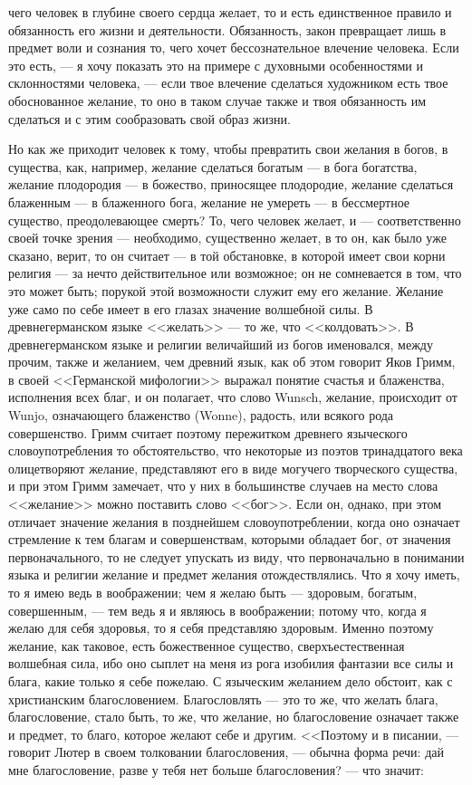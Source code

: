 \documentclass[12pt]{article}
\begin{document}
чего человек в глубине своего сердца желает, то и есть единственное правило и обязанность его жизни и деятельности. Обязанность, закон превращает лишь в предмет воли и сознания то, чего хочет бессознательное влечение человека. Если это есть, --- я хочу показать это на примере с духовными особенностями и склонностями человека, --- если твое влечение сделаться художником есть твое обоснованное желание, то оно в таком случае также и твоя обязанность им сделаться и с этим сообразовать свой образ жизни. 

Но как же приходит человек к тому, чтобы превратить свои желания в богов, в существа, как, например, желание сделаться богатым --- в бога богатства, желание плодородия --- в божество, приносящее плодородие, желание сделаться блаженным --- в блаженного бога, желание не умереть --- в бессмертное существо, преодолевающее смерть? То, чего человек желает, и --- соответственно своей точке зрения --- необходимо, существенно желает, в то он, как было уже сказано, верит, то он считает --- в той обстановке, в которой имеет свои корни религия --- за нечто действительное или возможное; он не сомневается в том, что это может быть; порукой этой возможности служит ему его желание. Желание уже само по себе имеет в его глазах значение волшебной силы. В древнегерманском языке <<желать>> --- то же, что <<колдовать>>. В древнегерманском языке и религии величайший из богов именовался, между прочим, также и желанием, чем древний язык, как об этом говорит Яков Гримм, в своей <<Германской мифологии>>  выражал понятие счастья и блаженства, исполнения всех благ, и он полагает, что слово Wunsch, желание, происходит от Wunjo, означающего блаженство (Wonne), радость, или всякого рода совершенство. Гримм считает поэтому пережитком древнего языческого словоупотребления то обстоятельство, что некоторые из поэтов тринадцатого века олицетворяют желание, представляют его в виде могучего творческого существа, и при этом Гримм замечает, что у них в большинстве случаев на место слова <<желание>> можно поставить слово <<бог>>. Если он, однако, при этом отличает значение желания в позднейшем словоупотреблении, когда оно означает стремление к тем благам и совершенствам, которыми обладает бог, от значения первоначального, то не следует упускать из виду, что первоначально в понимании языка и религии желание и предмет желания отождествлялись. Что я хочу иметь, то я имею ведь в воображении; чем я желаю быть --- здоровым, богатым, совершенным, --- тем ведь я и являюсь в воображении; потому что, когда я желаю для себя здоровья, то я себя представляю здоровым. Именно поэтому желание, как таковое, есть божественное существо, сверхъестественная волшебная сила, ибо оно сыплет на меня из рога изобилия фантазии все силы и блага, какие только я себе пожелаю. С языческим желанием дело обстоит, как с христианским благословением. Благословлять --- это то же, что желать блага, благословение, стало быть, то же, что желание, но благословение означает также и предмет, то благо, которое желают себе и другим. <<Поэтому и в писании, --- говорит Лютер в своем толковании благословения, --- обычна форма речи: дай мне благословение, разве у тебя нет больше благословения? --- что значит: 
\end{document}
